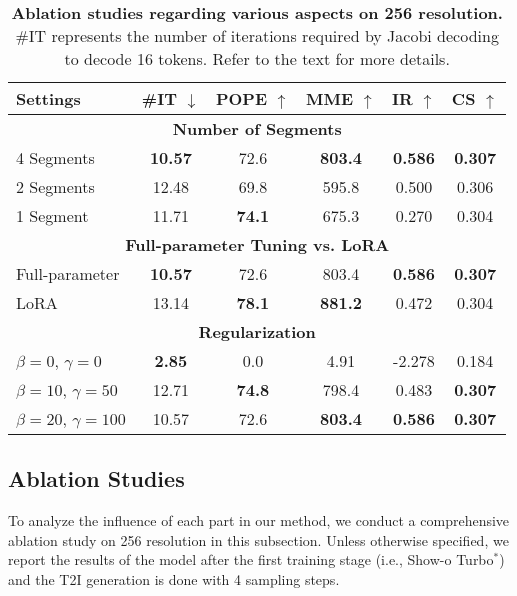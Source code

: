 \begin{table}[t]
    \centering
        \setlength{\tabcolsep}{2.5pt}
        \begin{tabular}{l|ccc|cc}
            \toprule
            \textbf{\small Settings} & \textbf{\small \#IT \large$\downarrow$} & \textbf{\small POPE \large$\uparrow$} & \textbf{\small MME \large$\uparrow$} & \textbf{\small IR \large$\uparrow$} & \textbf{\small CS \large$\uparrow$} \\
            \midrule
            \multicolumn{6}{c}{\textbf{Number of Segments}} \\
            \midrule
            4 Segments & \textbf{10.57} & 72.6 & \textbf{803.4} & \textbf{0.586} & \textbf{0.307} \\
            2 Segments & 12.48 & 69.8 & 595.8 & 0.500 & 0.306 \\
            1 Segment  & 11.71 & \textbf{74.1} & 675.3 & 0.270 & 0.304 \\
            \midrule
            \multicolumn{6}{c}{\textbf{Full-parameter Tuning vs. LoRA}} \\
            \midrule
            Full-parameter & \textbf{10.57} & 72.6 & 803.4 & \textbf{0.586} & \textbf{0.307} \\
            LoRA & 13.14 & \textbf{78.1} & \textbf{881.2} & 0.472 & 0.304 \\
            \midrule
            \multicolumn{6}{c}{\textbf{Regularization}} \\
            \midrule
            $\beta=0$, $\gamma=0$ & \textbf{2.85} & 0.0 & 4.91 & -2.278 & 0.184 \\
            $\beta=10$, $\gamma=50$ & 12.71 & \textbf{74.8} & 798.4 & 0.483 & \textbf{0.307} \\
            $\beta=20$, $\gamma=100$ & 10.57 & 72.6 & \textbf{803.4} & \textbf{0.586} & \textbf{0.307} \\
            \bottomrule
        \end{tabular}%
    \caption{\textbf{Ablation studies regarding various aspects on 256 resolution.} \#IT represents the number of iterations required by Jacobi decoding to decode 16 tokens. Refer to the text for more details. }
    \label{tab:combined_comparison_extended}
\end{table}




\subsection{Ablation Studies}
To analyze the influence of each part in our method, we conduct a comprehensive ablation study on 256 resolution in this subsection. 
Unless otherwise specified, we report the results of the model after the first training stage (i.e., Show-o Turbo$^*$) and the T2I generation is done with 4 sampling steps. 

